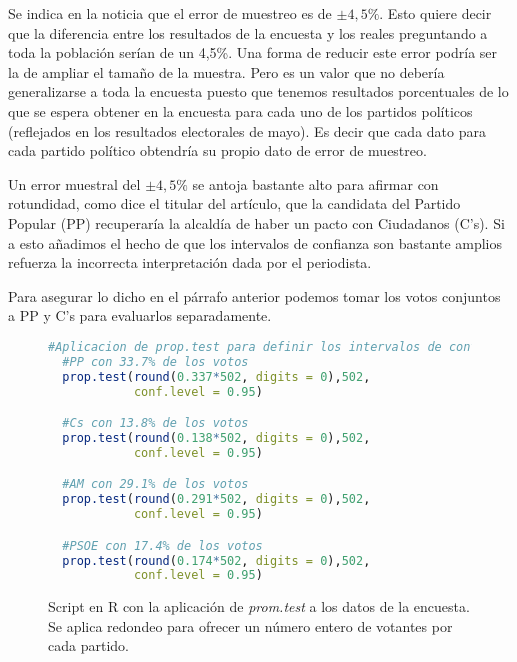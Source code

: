 \documentclass[11pt,a4paper]{article}
\begin{document}
Se indica en la noticia que el error de muestreo es de $\pm4,5\%$. Esto quiere decir que la diferencia entre los resultados de la encuesta y los reales preguntando a toda la población serían de un 4,5\%. Una forma de reducir este error podría ser la de ampliar el tamaño de la muestra. Pero es un valor que no debería generalizarse a toda la encuesta puesto que tenemos resultados porcentuales de lo que se espera obtener en la encuesta para cada uno de los partidos políticos (reflejados en los resultados electorales de mayo). Es decir que cada dato para cada partido político obtendría su propio dato de error de muestreo.

Un error muestral del $\pm4,5\%$ se antoja bastante alto para afirmar con rotundidad, como dice el titular del artículo, que la candidata del  Partido Popular (PP) recuperaría la alcaldía de haber un pacto con Ciudadanos (C's). Si a esto añadimos el hecho de que los intervalos de confianza son bastante amplios refuerza la incorrecta interpretación dada por el periodista.

Para asegurar lo dicho en el párrafo anterior podemos tomar los votos conjuntos a PP y C's para evaluarlos separadamente.

\begin{figure}
\centering
\begin{lstlisting}[language=R]
  #Aplicacion de prop.test para definir los intervalos de confianza con n = 502 y nivel de confianza del 95%
  #PP con 33.7% de los votos
  prop.test(round(0.337*502, digits = 0),502,
            conf.level = 0.95)

  #Cs con 13.8% de los votos
  prop.test(round(0.138*502, digits = 0),502,
            conf.level = 0.95)

  #AM con 29.1% de los votos
  prop.test(round(0.291*502, digits = 0),502,
            conf.level = 0.95)

  #PSOE con 17.4% de los votos
  prop.test(round(0.174*502, digits = 0),502,
            conf.level = 0.95)
\end{lstlisting}
\caption{Script en R con la aplicación de \textit{prom.test} a los datos de la encuesta. Se aplica redondeo para ofrecer un número entero de votantes por cada partido.}
\label{fig:proptest}
\end{figure}
\end{document}
